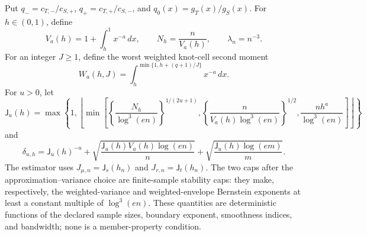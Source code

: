 Put \(q_-=c_{T,-}/c_{S,+}\), \(q_+=c_{T,+}/c_{S,-}\), and \(q_0(x)=g_T(x)/g_S(x)\).  For \(h\in(0,1)\), define
\[
 V_a(h)=1+\int_h^1x^{-a}\,dx,
 \qquad
 N_h=\frac{n}{V_a(h)},
 \qquad
 \lambda_n=n^{-3}.
\]
For an integer \(J\ge1\), define the worst weighted knot-cell second moment
\[
 W_a(h,J)=\int_h^{\min\{1,h+(q+1)/J\}}x^{-a}\,dx.
\]
For \(u>0\), let
\[
 \mathsf J_u(h)=\max\!\left\{1,\left\lfloor
 \min\!\left[
 \left\{\frac{N_h}{\log^3(en)}\right\}^{1/(2u+1)},
 \left\{\frac{n}{V_a(h)\log^3(en)}\right\}^{1/2},
 \frac{nh^a}{\log^3(en)}
 \right]\right\rfloor\right\}
\]
and
\[
 \delta_{u,h}=\mathsf J_u(h)^{-u}
 +\sqrt{\frac{\mathsf J_u(h)V_a(h)\log(en)}{n}}
 +\sqrt{\frac{\mathsf J_u(h)\log(em)}{m}}.
\]
The estimator uses \(J_{\mu,n}=\mathsf J_s(h_n)\) and \(J_{r,n}=\mathsf J_t(h_n)\).  The two caps after the approximation--variance choice are finite-sample stability caps: they make, respectively, the weighted-variance and weighted-envelope Bernstein exponents at least a constant multiple of \(\log^3(en)\).  These quantities are deterministic functions of the declared sample sizes, boundary exponent, smoothness indices, and bandwidth; none is a member-property condition.